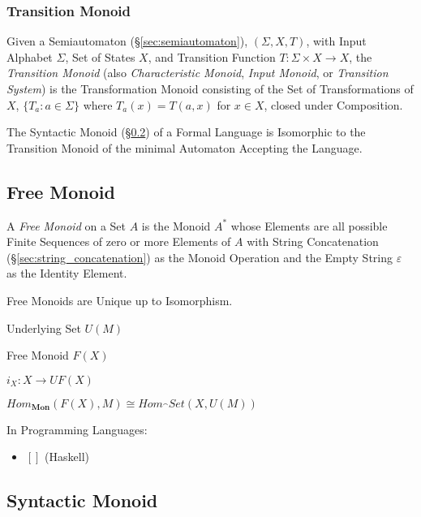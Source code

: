 \subsubsection{Transition Monoid}\label{sec:transition_monoid}

Given a Semiautomaton (\S\ref{sec:semiautomaton}), $(\Sigma, X, T)$,
with Input Alphabet $\Sigma$, Set of States $X$, and Transition
Function $T : \Sigma \times X \rightarrow X$, the \emph{Transition
  Monoid} (also \emph{Characteristic Monoid}, \emph{Input Monoid}, or
\emph{Transition System}) is the Transformation Monoid consisting of
the Set of Transformations of $X$, $\{T_a : a \in \Sigma\}$ where
$T_a(x) = T(a,x)$ for $x \in X$, closed under Composition.

The Syntactic Monoid (\S\ref{sec:syntactic_monoid}) of a Formal
Language is Isomorphic to the Transition Monoid of the minimal
Automaton Accepting the Language.



\subsection{Free Monoid}\label{sec:free_monoid}

A \emph{Free Monoid} on a Set $A$ is the Monoid $A^*$ whose Elements
are all possible Finite Sequences of zero or more Elements of $A$ with
String Concatenation (\S\ref{sec:string_concatenation}) as the Monoid
Operation and the Empty String $\varepsilon$ as the Identity Element.

Free Monoids are Unique up to Isomorphism.

Underlying Set $U(M)$

Free Monoid $F(X)$

$i_X : X \rightarrow U F (X)$

$Hom_\mathbf{Mon}(F(X), M) \cong Hom_\cat{Set}(X, U(M))$

In Programming Languages:

\begin{itemize}
  \item $\mathtt{[]}$ (Haskell)
\end{itemize}



\subsection{Syntactic Monoid}\label{sec:syntactic_monoid}

